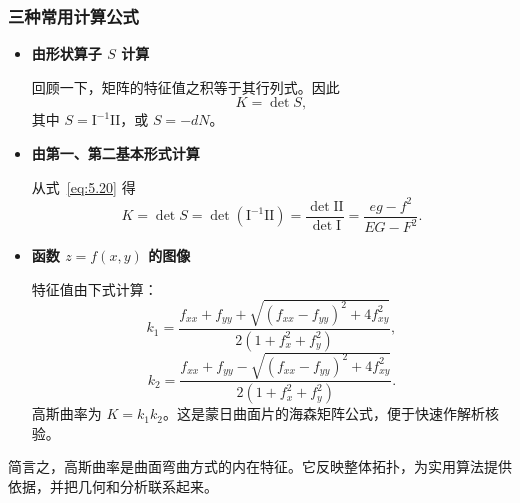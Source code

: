 \subsubsection{三种常用计算公式}
\begin{itemize}
  \item \textbf{由形状算子 $S$ 计算}

  回顾一下，矩阵的特征值之积等于其行列式。因此
  \begin{equation*}
    K=\det S,
    \tag{5.20}\label{eq:5.20}
  \end{equation*}
  其中 $S=\mathrm I^{-1}\mathrm{II}$，或 $S=-dN$。
  \item \textbf{由第一、第二基本形式计算}

  从式~\eqref{eq:5.20} 得
  \[
    K=\det S=\det(\mathrm I^{-1}\mathrm{II})
       =\frac{\det\mathrm{II}}{\det\mathrm I}=\frac{eg-f^2}{EG-F^2}.
  \]
  \item \textbf{函数 $z=f(x,y)$ 的图像}

  特征值由下式计算：
  \[
    k_1=\frac{f_{xx}+f_{yy}+\sqrt{(f_{xx}-f_{yy})^2+4f_{xy}^2}}
        {2(1+f_x^2+f_y^2)},
  \]
  \[
    k_2=\frac{f_{xx}+f_{yy}-\sqrt{(f_{xx}-f_{yy})^2+4f_{xy}^2}}
        {2(1+f_x^2+f_y^2)}.
  \]
  高斯曲率为 $K=k_1k_2$。这是蒙日曲面片的海森矩阵公式，便于快速作解析核验。
\end{itemize}

简言之，高斯曲率是曲面弯曲方式的内在特征。它反映整体拓扑，为实用算法提供依据，并把几何和分析联系起来。


